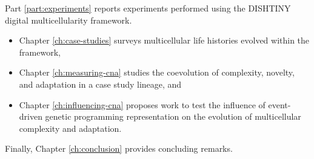 Part \ref{part:experiments} reports experiments performed using the DISHTINY digital multicellularity framework.
\begin{itemize}
\item Chapter \ref{ch:case-studies} surveys multicellular life histories evolved within the framework,
\item Chapter \ref{ch:measuring-cna} studies the coevolution of complexity, novelty, and adaptation in a case study lineage, and
\item Chapter \ref{ch:influencing-cna} proposes work to test the influence of event-driven genetic programming representation on the evolution of multicellular complexity and adaptation.
\end{itemize}

Finally, Chapter \ref{ch:conclusion} provides concluding remarks.
